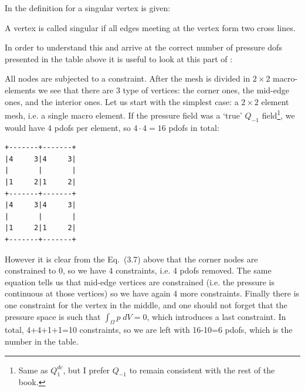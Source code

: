 In \textcite{zhan08} the definition for a singular vertex is given:
\begin{displayquote}
{\color{darkgray}
A vertex is called singular if all edges meeting at the vertex form two cross lines.
}
\end{displayquote}

In order to understand this and arrive at the correct number of pressure dofs
presented in the table above 
it is useful to look at this part of \textcite{huzh11}:

\begin{center}
\end{center}

All nodes are subjected to a constraint. After the mesh is divided 
in $2\times 2$ macro-elements we see that there are 3 type of vertices: the corner ones, 
the mid-edge ones, and the interior ones. 
Let us start with the simplest case: a $2\times 2$ element mesh, i.e. a single macro element.
If the pressure field was a `true' $Q_{-1}$ field\footnote{
Same as $Q_1^{dc}$, but I prefer $Q_{-1}$ to remain consistent 
with the rest of the book.}, we would have 4 pdofs per element,
so $4\cdot 4=16$ pdofs in total:
\begin{verbatim}
+-------+-------+
|4     3|4     3|
|       |       |
|1     2|1     2|
+-------+-------+
|4     3|4     3|
|       |       |
|1     2|1     2|
+-------+-------+
\end{verbatim}
However it is clear from the Eq.~(3.7) above that the corner nodes are constrained to 0, so we
have 4 constraints, i.e. 4 pdofs removed. 
The same equation tells us that mid-edge vertices are constrained (i.e. the pressure 
is continuous at those vertices) so we have again 4 more constraints.
Finally there is one constraint for the vertex in the middle, and one should not 
forget that the pressure space is such that  $\int _\Omega p \; dV=0$, which 
introduces a last constraint. 
In total, 4+4+1+1=10 constraints, so we are left with 16-10=6 pdofs, which is the 
number in the table.

